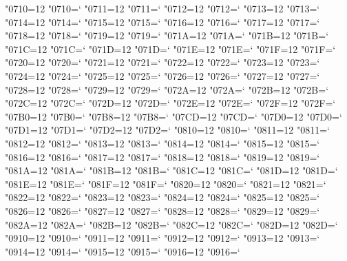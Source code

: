 \catcode"0710=12 \lccode"0710=`\a
\catcode"0711=12 \lccode"0711=`\a
\catcode"0712=12 \lccode"0712=`\a
\catcode"0713=12 \lccode"0713=`\a
\catcode"0714=12 \lccode"0714=`\a
\catcode"0715=12 \lccode"0715=`\a
\catcode"0716=12 \lccode"0716=`\a
\catcode"0717=12 \lccode"0717=`\a
\catcode"0718=12 \lccode"0718=`\a
\catcode"0719=12 \lccode"0719=`\a
\catcode"071A=12 \lccode"071A=`\a
\catcode"071B=12 \lccode"071B=`\a
\catcode"071C=12 \lccode"071C=`\a
\catcode"071D=12 \lccode"071D=`\a
\catcode"071E=12 \lccode"071E=`\a
\catcode"071F=12 \lccode"071F=`\a
\catcode"0720=12 \lccode"0720=`\a
\catcode"0721=12 \lccode"0721=`\a
\catcode"0722=12 \lccode"0722=`\a
\catcode"0723=12 \lccode"0723=`\a
\catcode"0724=12 \lccode"0724=`\a
\catcode"0725=12 \lccode"0725=`\a
\catcode"0726=12 \lccode"0726=`\a
\catcode"0727=12 \lccode"0727=`\a
\catcode"0728=12 \lccode"0728=`\a
\catcode"0729=12 \lccode"0729=`\a
\catcode"072A=12 \lccode"072A=`\a
\catcode"072B=12 \lccode"072B=`\a
\catcode"072C=12 \lccode"072C=`\a
\catcode"072D=12 \lccode"072D=`\a
\catcode"072E=12 \lccode"072E=`\a
\catcode"072F=12 \lccode"072F=`\a
\catcode"07B0=12 \lccode"07B0=`\a
\catcode"07B8=12 \lccode"07B8=`\a
\catcode"07CD=12 \lccode"07CD=`\a
\catcode"07D0=12 \lccode"07D0=`\a
\catcode"07D1=12 \lccode"07D1=`\a
\catcode"07D2=12 \lccode"07D2=`\a
\catcode"0810=12 \lccode"0810=`\a
\catcode"0811=12 \lccode"0811=`\a
\catcode"0812=12 \lccode"0812=`\a
\catcode"0813=12 \lccode"0813=`\a
\catcode"0814=12 \lccode"0814=`\a
\catcode"0815=12 \lccode"0815=`\a
\catcode"0816=12 \lccode"0816=`\a
\catcode"0817=12 \lccode"0817=`\a
\catcode"0818=12 \lccode"0818=`\a
\catcode"0819=12 \lccode"0819=`\a
\catcode"081A=12 \lccode"081A=`\a
\catcode"081B=12 \lccode"081B=`\a
\catcode"081C=12 \lccode"081C=`\a
\catcode"081D=12 \lccode"081D=`\a
\catcode"081E=12 \lccode"081E=`\a
\catcode"081F=12 \lccode"081F=`\a
\catcode"0820=12 \lccode"0820=`\a
\catcode"0821=12 \lccode"0821=`\a
\catcode"0822=12 \lccode"0822=`\a
\catcode"0823=12 \lccode"0823=`\a
\catcode"0824=12 \lccode"0824=`\a
\catcode"0825=12 \lccode"0825=`\a
\catcode"0826=12 \lccode"0826=`\a
\catcode"0827=12 \lccode"0827=`\a
\catcode"0828=12 \lccode"0828=`\a
\catcode"0829=12 \lccode"0829=`\a
\catcode"082A=12 \lccode"082A=`\a
\catcode"082B=12 \lccode"082B=`\a
\catcode"082C=12 \lccode"082C=`\a
\catcode"082D=12 \lccode"082D=`\a
\catcode"0910=12 \lccode"0910=`\a
\catcode"0911=12 \lccode"0911=`\a
\catcode"0912=12 \lccode"0912=`\a
\catcode"0913=12 \lccode"0913=`\a
\catcode"0914=12 \lccode"0914=`\a
\catcode"0915=12 \lccode"0915=`\a
\catcode"0916=12 \lccode"0916=`\a
